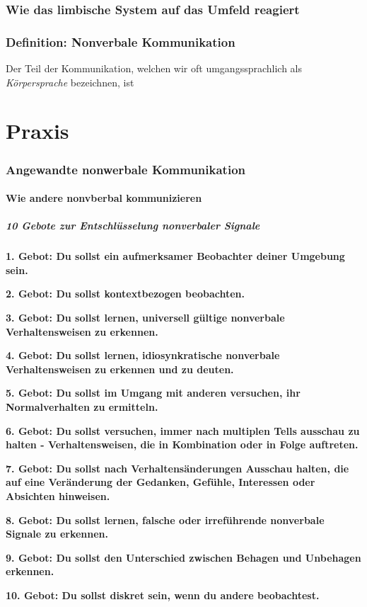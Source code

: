 \documentclass[
    invert-title=false,
    titlepage=true,
    titleimage-ratio=1011,
    parskip=half-,
]{bfhpub}                %
\begin{document}
    \section{Wie das limbische System auf das Umfeld reagiert}\label{sec:die-reaktionen-des-limbischen-systems}
    



    \section{Definition: Nonverbale Kommunikation}
    Der Teil der Kommunikation, welchen wir oft umgangssprachlich als \textit{Körpersprache} bezeichnen, ist


    \part{Praxis}


    \section{Angewandte nonwerbale Kommunikation}

    \subsection{Wie andere nonvberbal kommunizieren}

    \subsubsection{10 Gebote zur Entschlüsselung nonverbaler Signale}
    \hskip 12pt\relax\textbf{1. Gebot: Du sollst ein aufmerksamer Beobachter deiner Umgebung sein.}
    \par\textbf{2. Gebot: Du sollst kontextbezogen beobachten.}
    \par\textbf{3. Gebot: Du sollst lernen, universell gültige nonverbale Verhaltensweisen zu erkennen.}
    \par\textbf{4. Gebot: Du sollst lernen, idiosynkratische nonverbale Verhaltensweisen zu erkennen und zu deuten.}
    \par\textbf{5. Gebot: Du sollst im Umgang mit anderen versuchen, ihr Normalverhalten zu ermitteln.}
    \par\textbf{6. Gebot: Du sollst versuchen, immer nach multiplen Tells ausschau zu halten - Verhaltensweisen, die in Kombination oder in Folge auftreten.}
    \par\textbf{7. Gebot: Du sollst nach Verhaltensänderungen Ausschau halten, die auf eine Veränderung der Gedanken, Gefühle, Interessen oder Absichten hinweisen.}
    \par\textbf{8. Gebot: Du sollst lernen, falsche oder irreführende nonverbale Signale zu erkennen.}
    \par\textbf{9. Gebot: Du sollst den Unterschied zwischen Behagen und Unbehagen erkennen.}
    \par\textbf{10. Gebot: Du sollst diskret sein, wenn du andere beobachtest.}
\end{document}

